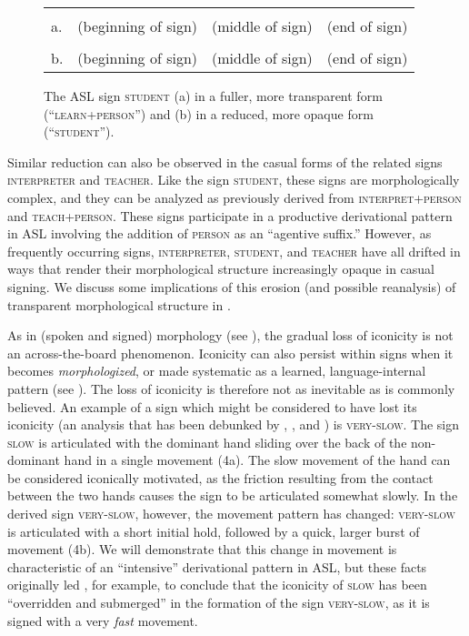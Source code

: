 \documentclass[output=paper,
modfonts
]{LSP/langsci}
\begin{document}
\begin{figure}
	\begin{tabularx}{\linewidth}{lCCC}
		&  &  &  \\
		a. & (beginning of sign) & (middle of sign) & (end of sign) \\
		&  &  &  \\
		b. & (beginning of sign) & (middle of sign) & (end of sign) \\
	\end{tabularx}	
	\caption{The ASL sign \textsc{student} (a) in a fuller, more transparent form (``\textsc{learn+person}'') and (b) in a reduced, more opaque form (``\textsc{student}'').}
	\label{fig:3}
\end{figure}

Similar reduction can also be observed in the casual forms of the related signs \textsc{interpreter} and \textsc{teacher}. Like the sign \textsc{student}, these signs are morphologically complex, and they can be analyzed as previously derived from \textsc{interpret+person} and \textsc{teach+person}. These signs participate in a productive derivational pattern in ASL involving the addition of \textsc{person} as an ``agentive suffix.'' However, as frequently occurring signs, \textsc{interpreter}, \textsc{student}, and \textsc{teacher} have all drifted in ways that render their morphological structure increasingly opaque in casual signing. We discuss some implications of this erosion (and possible reanalysis) of transparent morphological structure in .

  As in (spoken and signed) morphology (see \citealt{Bybee2006b}), the gradual loss of iconicity is not an across-the-board phenomenon. Iconicity can also persist within signs when it becomes \textit{morphologized}, or made systematic as a learned, language-internal pattern (see \citealt[337]{anderson1992}). The loss of iconicity is therefore not as inevitable as is commonly believed. An example of a sign which might be considered to have lost its iconicity (an analysis that has been debunked by \citealt[153]{Wilcox1995}, \citealt[228]{Taub2001}, and \citealt[123]{Wilcox2004}) is \textsc{very-slow}. The sign \textsc{slow} is articulated with the dominant hand sliding over the back of the non-dominant hand in a single movement (4a). The slow movement of the hand can be considered iconically motivated, as the friction resulting from the contact between the two hands causes the sign to be articulated somewhat slowly. In the derived sign \textsc{very-slow}, however, the movement pattern has changed: \textsc{very-slow} is articulated with a short initial hold, followed by a quick, larger burst of movement (4b). We will demonstrate that this change in movement is characteristic of an ``intensive'' derivational pattern in ASL, but these facts originally led \citet[30]{Klima1979}, for example, to conclude that the iconicity of \textsc{slow} has been ``overridden and submerged'' in the formation of the sign \textsc{very-slow}, as it is signed with a very \textit{fast} movement.
\end{document}

